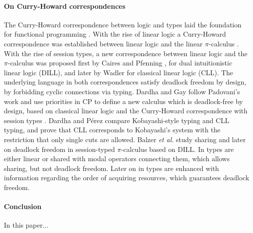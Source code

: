 \documentclass[main.tex]{subfiles}
\begin{document}
\paragraph{On Curry-Howard correspondences}
The Curry-Howard correspondence between logic and types laid the foundation for functional programming \cite{Wadler15}. With the rise of linear logic \cite{Girard87} a Curry-Howard correspondence was established between linear logic and the linear $\pi$-calculus \cite{Abramsky94,BellinS94}. With the rise of session types, a new correspondence between linear logic and the $\pi$-calculus was proposed first by Caires and Pfenning \cite{CP10}, for dual intuitionistic linear logic (DILL), and later by Wadler \cite{wadler2012} for classical linear logic (CLL). The underlying language in both correspondences satisfy deadlock freedom by design, by forbidding cyclic connections via typing. Dardha and Gay follow Padovani's work \cite{P14} and use priorities in CP to define a new calculus which is deadlock-free by design, based on classical linear logic \cite{Girard87}  and the Curry-Howard correspondence with session types \cite{wadler2012}. Dardha and P\'{e}rez \cite{DardhaP15} compare Kobayashi-style typing and CLL typing, and prove that CLL corresponds to Kobayashi's system with the restriction that only single cuts are allowed. Balzer \emph{et al.} study sharing \cite{BalzerP17} and later on deadlock freedom \cite{BalzerTP19} in session-typed $\pi$-calculus based on DILL. In \cite{BalzerP17} types are either linear or shared with modal operators connecting them, which allows sharing, but not deadlock freedom. Later on in \cite{BalzerTP19} types are enhanced with information regarding the order of acquiring resources, which guarantees deadlock freedom.

\paragraph{Conclusion}
In this paper...
\end{document}
